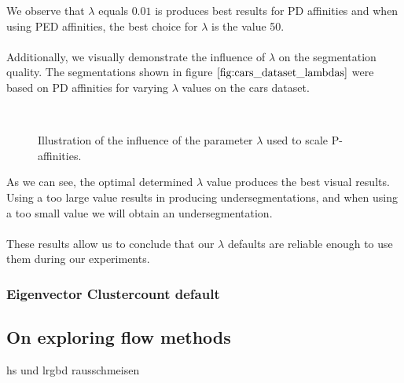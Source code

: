 We observe that $\lambda$ equals $0.01$ is produces best results for PD affinities and when using PED affinities, the best choice for $\lambda$ is the value 50. \\ \\
Additionally, we visually demonstrate the influence of $\lambda$ on the segmentation quality. The segmentations shown in figure $\ref{fig:cars_dataset_lambdas}$ were based on PD affinities for varying $\lambda$ values on the cars dataset.
\begin{figure}[H]
\begin{center}
~
\end{center}
\caption[Influence varying $\lambda$]{Illustration of the influence of the parameter $\lambda$ used to scale P-affinities.}
\label{fig:cars_dataset_lambdas}
\end{figure}
As we can see, the optimal determined $\lambda$ value produces the best visual results. Using a too large value results in producing undersegmentations, and when using a too small value we will obtain an undersegmentation. \\ \\
These results allow us to conclude that our $\lambda$ defaults are reliable enough to use them during our experiments.


\subsubsection{Eigenvector Clustercount default}

\subsection{On exploring flow methods}
hs und lrgbd rausschmeisen

